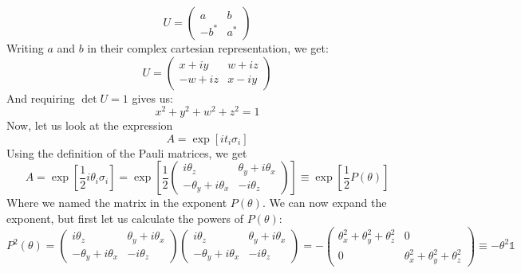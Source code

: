 \documentclass{article}
\begin{document}
\begin{equation}
\label{eq:su_complex_numebrs_rep}
    U = \begin{pmatrix} a & b \\ -b^* & a^* \end{pmatrix}
\end{equation}
Writing $a$ and $b$ in their complex cartesian representation, we get:
\begin{equation}
    \label{eq:final_u}
    U = \begin{pmatrix} x + iy & w + iz \\ -w + iz & x - iy \end{pmatrix}
\end{equation}
And requiring $\det U = 1$ gives us:
\begin{equation}
    \label{eq:final_u_condition}
    x^2 + y^2 + w^2 + z^2 = 1
\end{equation}
Now, let us look at the expression
\begin{equation}
    A = \exp\left[i t_i \sigma_i\right]
\end{equation}
Using the definition of the Pauli matrices, we get
\begin{equation}
    A = \exp\left[\frac{1}{2}i\theta_i \sigma_i\right] = \exp
        \left[\frac{1}{2}\begin{pmatrix}
            i\theta_z & \theta_y + i\theta_x \\
            - \theta_y+ i\theta_x & -i\theta_z
        \end{pmatrix}\right] \equiv \exp \left[\frac{1}{2}P(\theta)\right]
\end{equation}
Where we named the matrix in the exponent $P(\theta)$. We can now expand the exponent, but first let us calculate the powers of $P(\theta)$:
\begin{equation}
    P^2(\theta) = \begin{pmatrix}
            i\theta_z & \theta_y + i\theta_x \\
            - \theta_y+ i\theta_x & -i\theta_z
        \end{pmatrix}\begin{pmatrix}
            i\theta_z & \theta_y + i\theta_x \\
            - \theta_y+ i\theta_x & -i\theta_z
        \end{pmatrix}
        =
        -\begin{pmatrix}
            \theta_x^2 + \theta_y^2 + \theta_z^2 & 0 \\ 0 & \theta_x^2 + \theta_y^2 + \theta_z^2
        \end{pmatrix} \equiv -\theta^2 \mathbb{1}
\end{equation}
\end{document}

